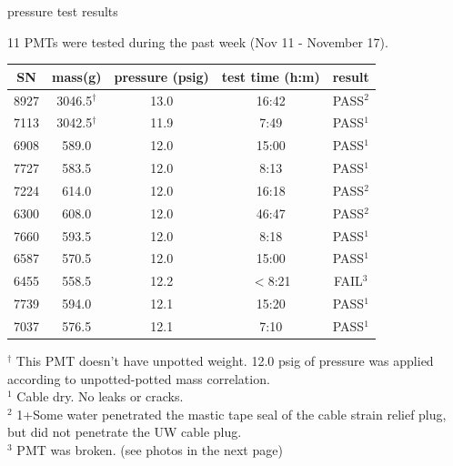 \documentclass{beamer}
\begin{document}
\begin{frame}{pressure test results}
	\begin{center}
		\small
		11 PMTs were tested during the past week (Nov 11 - November 17).
	\end{center}
\begin{table}
\small
{}
\begin{tabular}{c|c|c|c|c}
	SN & mass(g) & pressure (psig) & test time (h:m) & result \\
	\hline
	8927 & 3046.5$^\dagger$ & 13.0 & 16:42 & PASS$^2$ \\
	7113 & 3042.5$^\dagger$ & 11.9 & 7:49 & PASS$^1$ \\
	6908 & 589.0 & 12.0 & 15:00 & PASS$^1$ \\
	7727 & 583.5 & 12.0 & 8:13 & PASS$^1$ \\
	7224 & 614.0 & 12.0 & 16:18 & PASS$^2$ \\
	6300 & 608.0 & 12.0 & 46:47 & PASS$^2$ \\
	7660 & 593.5 & 12.0 & 8:18 & PASS$^1$ \\
	6587 & 570.5 & 12.0 & 15:00 & PASS$^1$ \\
	{\color{red}6455} & {\color{red}558.5} & {\color{red}12.2} & {\color{red}$<$8:21}
	& {\color{red}FAIL$^3$} \\
	7739 & 594.0 & 12.1 & 15:20 & PASS$^1$ \\
	7037 & 576.5 & 12.1 & 7:10 & PASS$^1$ \\
\end{tabular}
\end{table}
	\scriptsize
	$^\dagger$ This PMT doesn't have unpotted weight. 12.0 psig of pressure was applied
	according to unpotted-potted mass correlation.\\
	$^1$ Cable dry. No leaks or cracks.\\
	$^2$ 1+Some water penetrated the mastic tape seal of the cable
		strain relief plug, but did not penetrate the UW cable plug.\\
	{\color{red}$^3$ PMT was broken. (see photos in the next page)}

\end{frame}
\end{document}
